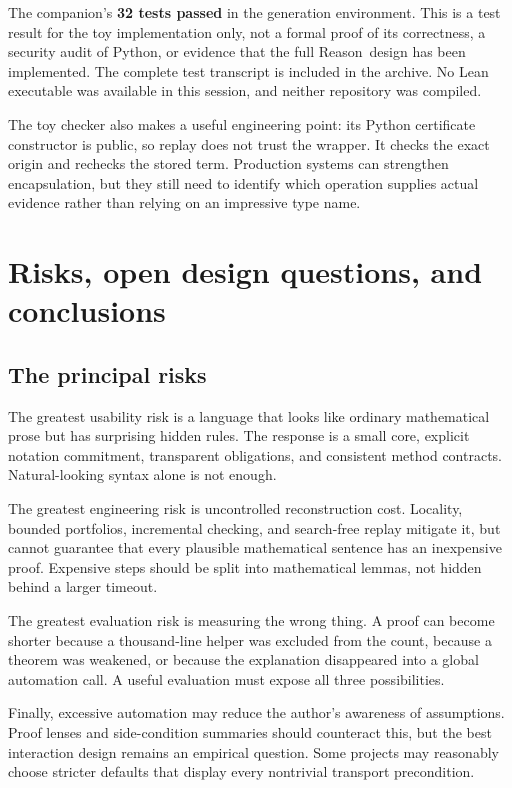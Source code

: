\documentclass[11pt,a4paper]{article}
\newcommand{\Reason}{\textsf{Reason}}
\theoremstyle{remark}
\begin{document}
The companion's \textbf{32 tests passed} in the generation environment. This is a test result for the toy implementation only, not a formal proof of its correctness, a security audit of Python, or evidence that the full \Reason\ design has been implemented. The complete test transcript is included in the archive. No Lean executable was available in this session, and neither repository was compiled.

The toy checker also makes a useful engineering point: its Python certificate constructor is public, so replay does not trust the wrapper. It checks the exact origin and rechecks the stored term. Production systems can strengthen encapsulation, but they still need to identify which operation supplies actual evidence rather than relying on an impressive type name.

\section{Risks, open design questions, and conclusions}\label{sec:conclusion}

\subsection{The principal risks}

The greatest usability risk is a language that looks like ordinary mathematical prose but has surprising hidden rules. The response is a small core, explicit notation commitment, transparent obligations, and consistent method contracts. Natural-looking syntax alone is not enough.

The greatest engineering risk is uncontrolled reconstruction cost. Locality, bounded portfolios, incremental checking, and search-free replay mitigate it, but cannot guarantee that every plausible mathematical sentence has an inexpensive proof. Expensive steps should be split into mathematical lemmas, not hidden behind a larger timeout.

The greatest evaluation risk is measuring the wrong thing. A proof can become shorter because a thousand-line helper was excluded from the count, because a theorem was weakened, or because the explanation disappeared into a global automation call. A useful evaluation must expose all three possibilities.

Finally, excessive automation may reduce the author's awareness of assumptions. Proof lenses and side-condition summaries should counteract this, but the best interaction design remains an empirical question. Some projects may reasonably choose stricter defaults that display every nontrivial transport precondition.
\end{document}
